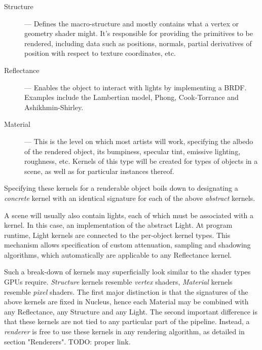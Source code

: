 \begin{description}

\item[Structure] --- Defines the macro-structure and mostly contains what a vertex or geometry shader might. It's responsible for providing the primitives to be rendered, including data such as positions, normals, partial derivatives of position with respect to texture coordinates, etc.

\item[Reflectance] --- Enables the object to interact with lights by implementing a BRDF. Examples include the Lambertian model, Phong, Cook-Torrance and Ashikhmin-Shirley.

\item[Material] --- This is the level on which most artists will work, specifying the albedo of the rendered object, its bumpiness, specular tint, emissive lighting, roughness, etc. Kernels of this type will be created for types of objects in a scene, as well as for particular instances thereof.

\end{description}

Specifying these kernels for a renderable object boils down to designating a \emph{concrete} kernel with an identical signature for each of the above \emph{abstract} kernels.

A scene will usually also contain lights, each of which must be associated with a kernel. In this case, an implementation of the abstract Light. At program runtime, Light kernels are connected to the per-object kernel types. This mechanism allows specification of custom attenuation, sampling and shadowing algorithms, which automatically are applicable to any Reflectance kernel.


Such a break-down of kernels may superficially look similar to the shader types GPUs require. \emph{Structure} kernels resemble \emph{vertex} shaders, \emph{Material} kernels resemble \emph{pixel} shaders. The first major distinction is that the signatures of the above kernels are fixed in Nucleus, hence each Material may be combined with any Reflectance, any Structure and any Light. The second important difference is that these kernels are not tied to any particular part of the pipeline. Instead, a \emph{renderer} is free to use these kernels in any rendering algorithm, as detailed in section "Renderers". TODO: proper link.

